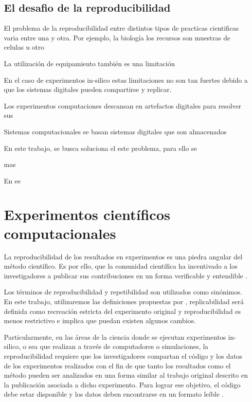 
\subsection{El desafio de la reproducibilidad}

El problema de la reproducibilidad entre distintos tipos de practicas cientificas varia entre una y otra.
Por ejemplo, la biología los recursos son muestras de celulas u otro

La utilización de equipamiento también es una limitación

En el caso de experimentos in-silico estas limitaciones no son tan fuertes debido a que los sistemas digitales pueden compartirse y replicar. 

Los experimentos computaciones descansan en artefactos digitales para resolver sus 


Sistemas computacionales se basan sistemas digitales que son almacenados

En este trabajo, se busca soluciona el este problema, para ello se 

mas

En ee


\section{Experimentos científicos computacionales} 

La reproducibilidad de los resultados en experimentos es una piedra angular del método científico. Es por ello, que la comunidad científica ha incentivado a los investigadores a publicar sus contribuciones en un forma verificable y entendible \cite{james2014standing,stodden2010reproducible}.

Los términos de reproducibilidad y repetibilidad son utilizados como sinónimos. En este trabajo, utilizaremos las definiciones propuestas por \cite{santana2017reproducibility}, replicabilidad será definida como recreación estricta del experimento original y reproducibilidad es menos restrictivo e implica que puedan existen algunos cambios.

Particularmente, en las áreas de la ciencia donde se ejecutan experimentos in-silico, o sea que realizan a través de computadores o simulaciones, la reproducibilidad requiere que los investigadores compartan el código y los datos de los experimentos realizados con el fin de que tanto los resultados como el método pueden ser analizados en una forma similar al trabajo original descrito en la publicación asociada a dicho experimento. Para lograr ese objetivo, el código debe estar disponible y los datos deben encontrarse en un formato leíble \cite{stodden2014implementing}.




